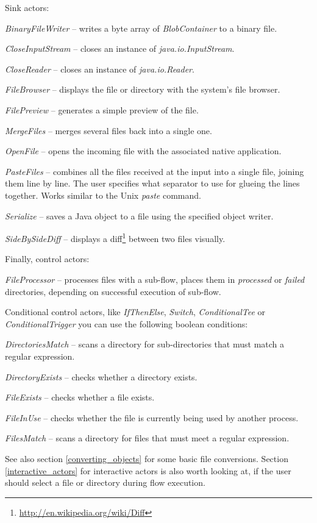 Sink actors:
\begin{tight_itemize}
	\item \textit{BinaryFileWriter} -- writes a byte array of 
	\textit{BlobContainer} to a binary file.
	\item \textit{CloseInputStream} -- closes an instance of \textit{java.io.InputStream}.
	\item \textit{CloseReader} -- closes an instance of \textit{java.io.Reader}.
	\item \textit{FileBrowser} -- displays the file or directory with the system's file browser.
	\item \textit{FilePreview} -- generates a simple preview of the file.
	\item \textit{MergeFiles} -- merges several files back into a single one.
	\item \textit{OpenFile} -- opens the incoming file with the associated
	native application.
	\item \textit{PasteFiles} -- combines all the files received at the input into
	a single file, joining them line by line. The user specifies what separator to
	use for glueing the lines together. Works similar to the Unix \textit{paste}
	command.
	\item \textit{Serialize} -- saves a Java object to a file using the specified object writer.
	\item \textit{SideBySideDiff} -- displays a diff\footnote{\url{http://en.wikipedia.org/wiki/Diff}{}} 
	between two files visually.
\end{tight_itemize}
Finally, control actors:
\begin{tight_itemize}
	\item \textit{FileProcessor} -- processes files with a sub-flow, places
	them in \textit{processed} or \textit{failed} directories, depending on
	successful execution of sub-flow.
\end{tight_itemize}
Conditional control actors, like \textit{IfThenElse}, \textit{Switch}, 
\textit{ConditionalTee} or \textit{ConditionalTrigger} you can use the following
boolean conditions:
\begin{tight_itemize}
	\item \textit{DirectoriesMatch} -- scans a directory for sub-directories 
	that must match a regular expression.
	\item \textit{DirectoryExists} -- checks whether a directory exists.
	\item \textit{FileExists} -- checks whether a file exists.
	\item \textit{FileInUse} -- checks whether the file is currently being
	used by another process.
	\item \textit{FilesMatch} -- scans a directory for files that must meet
	a regular expression.
\end{tight_itemize}
See also section \ref{converting_objects} for some basic file conversions.
Section \ref{interactive_actors} for interactive actors is also worth looking
at, if the user should select a file or directory during flow execution.


